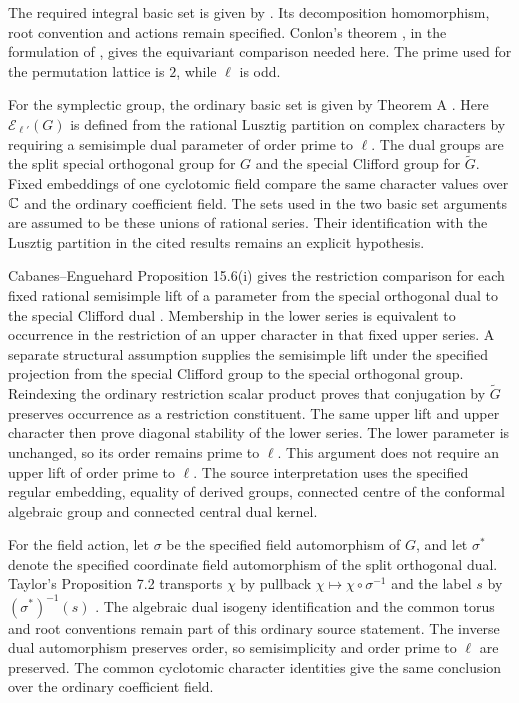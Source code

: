 The required integral basic set is given by
\cite[Theorem~5.1]{GeckHiss1991}. Its decomposition homomorphism, root
convention and actions remain specified. Conlon's theorem \cite{Conlon1968},
in the formulation of \cite[Theorem~3.5.5]{Bouc2000}, gives the equivariant
comparison needed here. The prime used for the permutation lattice is
$2$, while $\ell$ is odd.

For the symplectic group, the ordinary basic set is given by Theorem A
\cite{Geck1993}. Here $\mathcal E_{\ell'}(G)$ is defined from the rational
Lusztig partition on complex characters by requiring a semisimple dual
parameter of order prime to $\ell$. The dual groups are the split special
orthogonal group for $G$ and the special Clifford group for $\widetilde G$.
Fixed embeddings of one cyclotomic field compare the same character values
over $\mathbb C$ and the ordinary coefficient field. The sets used in the two
basic set arguments are assumed to be these unions of rational series. Their identification with the Lusztig partition in the
cited results remains an explicit hypothesis.

Cabanes--Enguehard Proposition 15.6(i) gives the restriction comparison for
each fixed rational semisimple lift of a parameter from the special orthogonal dual to the special Clifford dual
\cite{CabanesEnguehard2004}. Membership in the lower series is equivalent to
occurrence in the restriction of an upper character in that fixed upper
series. A separate structural assumption supplies the semisimple lift under
the specified projection from the special Clifford group to the special
orthogonal group. Reindexing the ordinary restriction scalar product proves
that conjugation by $\widetilde G$ preserves occurrence as a restriction constituent. The same upper lift and upper
character then prove diagonal stability of the lower series. The lower
parameter is unchanged, so its order remains prime to $\ell$. This argument
does not require an upper lift of order prime to $\ell$. The source
interpretation uses the specified regular embedding, equality of derived
groups, connected centre of the conformal algebraic group and connected central dual kernel.

For the field action, let $\sigma$ be the specified field automorphism of $G$,
and let $\sigma^*$ denote the specified coordinate field automorphism of the
split orthogonal dual. Taylor's Proposition 7.2 transports $\chi$ by
pullback $\chi\mapsto\chi\circ\sigma^{-1}$ and the label $s$ by $(\sigma^*)^{-1}(s)$
\cite{Taylor2018Automorphisms}. The algebraic dual isogeny identification
and the common torus and root conventions remain part of this ordinary
source statement. The inverse dual automorphism preserves order, so
semisimplicity and order prime to $\ell$ are preserved. The common
cyclotomic character identities give the same conclusion over the ordinary
coefficient field.

